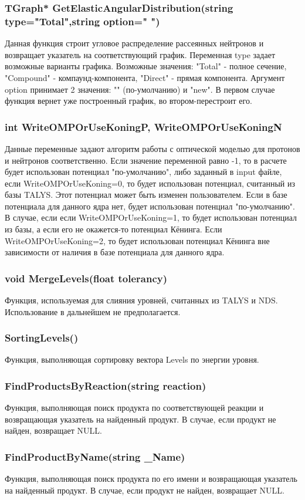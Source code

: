 \documentclass[a4paper,12pt]{extarticle}
\begin{document}
\subsubsection{TGraph* GetElasticAngularDistribution(string type="Total",string option=" ")}
Данная функция строит угловое распределение рассеянных нейтронов и возвращает указатель на соответствующий график. Переменная type задает возможные варианты графика. Возможные значения: "Total" - полное сечение, "Compound" - компаунд-компонента, "Direct" - прямая компонента. Аргумент option принимает 2 значения: "" (по-умолчанию) и "new". В первом случае функция вернет уже построенный график, во втором-перестроит его.
\subsubsection{int WriteOMPOrUseKoningP, WriteOMPOrUseKoningN}
Данные переменные задают алгоритм работы с оптической моделью для протонов и нейтронов соответственно. Если значение переменной равно -1, то в расчете будет использован потенциал "по-умолчанию", либо заданный в input файле, если WriteOMPOrUseKoning=0, то будет использован потенциал, считанный из базы TALYS. Этот потенциал может быть изменен пользователем. Если в базе потенциала для данного ядра нет, будет использован потенциал "по-умолчанию". В случае, если если WriteOMPOrUseKoning=1, то будет использован потенциал из базы, а если его не окажется-то потенциал Кёнинга. Если WriteOMPOrUseKoning=2, то будет использован потенциал Кёнинга вне зависимости от наличия в базе потенциала для данного ядра.
\subsubsection{void MergeLevels(float tolerancy)}
Функция, используемая для слияния уровней, считанных из TALYS и NDS. Использование в дальнейшем не предполагается.
\subsubsection{SortingLevels()}
Функция, выполняющая сортировку вектора Levels по энергии уровня. 
\subsubsection{FindProductsByReaction(string reaction)}
Функция, выполняющая поиск продукта по соответствующей реакции и возвращающая указатель на найденный продукт. В случае, если продукт не найден, возвращает NULL.
\subsubsection{FindProductByName(string _Name)}
Функция, выполняющая поиск продукта по его имени и возвращающая указатель на найденный продукт. В случае, если продукт не найден, возвращает NULL.
\end{document}
